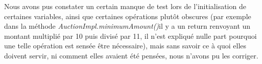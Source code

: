 \documentclass{article}
\begin{document}
Nous avons pus constater un certain manque de test lors de l'initialisation de certaines variables, ainsi que certaines opérations plutôt obscures (par exemple dans la méthode  \textit{AuctionImpl.minimumAmount()}il y a un return renvoyant un montant multiplié par 10 puis divisé par 11, il n'est expliqué nulle part pourquoi une telle opération est sensée être nécessaire), mais sans savoir ce à quoi elles doivent servir, ni comment elles avaient été pensées, nous n'avons pu les corriger.
\end{document}
